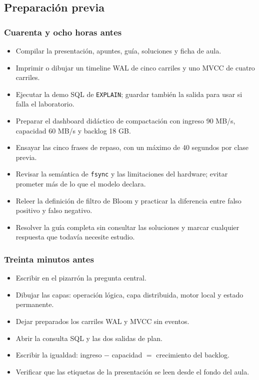 \documentclass[variant=docente,cover=institutional,mode=screen]{ua-engineering-v6-article}
\begin{document}
\subsection{Preparación previa}

\subsubsection*{Cuarenta y ocho horas antes}

\begin{itemize}
\item Compilar la presentación, apuntes, guía, soluciones y ficha de aula.
\item Imprimir o dibujar un timeline WAL de cinco carriles y uno MVCC de cuatro carriles.
\item Ejecutar la demo SQL de \texttt{EXPLAIN}; guardar también la salida para usar si falla el laboratorio.
\item Preparar el dashboard didáctico de compactación con ingreso 90 MB/s, capacidad 60 MB/s y backlog 18 GB.
\item Ensayar las cinco frases de repaso, con un máximo de 40 segundos por clase previa.
\item Revisar la semántica de \texttt{fsync} y las limitaciones del hardware; evitar prometer más de lo que el modelo declara.
\item Releer la definición de filtro de Bloom y practicar la diferencia entre falso positivo y falso negativo.
\item Resolver la guía completa sin consultar las soluciones y marcar cualquier respuesta que todavía necesite estudio.
\end{itemize}

\subsubsection*{Treinta minutos antes}

\begin{itemize}
\item Escribir en el pizarrón la pregunta central.
\item Dibujar las capas: operación lógica, capa distribuida, motor local y estado permanente.
\item Dejar preparados los carriles WAL y MVCC sin eventos.
\item Abrir la consulta SQL y las dos salidas de plan.
\item Escribir la igualdad: ingreso $-$ capacidad $=$ crecimiento del backlog.
\item Verificar que las etiquetas de la presentación se leen desde el fondo del aula.
\end{itemize}
\end{document}
